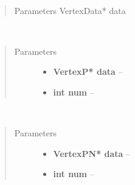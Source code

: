 \documentclass[letterpaper,10pt,english]{sphinxmanual}
\begin{document}

\begin{fulllineitems}
\label{gl:VBO::setVertexData__VertexDataP}~\begin{quote}\begin{description}
\item[{Parameters VertexData* data}] \leavevmode


\end{description}\end{quote}

\end{fulllineitems}


\begin{fulllineitems}
\label{gl:VBO::setVertexData__VertexPP.i}~\begin{quote}\begin{description}
\item[{Parameters}] \leavevmode\begin{itemize}
\item {} 
\textbf{VertexP* data} -- 

\item {} 
\textbf{int num} -- 

\end{itemize}

\end{description}\end{quote}

\end{fulllineitems}


\begin{fulllineitems}
\label{gl:VBO::setVertexData__VertexPNP.i}~\begin{quote}\begin{description}
\item[{Parameters}] \leavevmode\begin{itemize}
\item {} 
\textbf{VertexPN* data} -- 

\item {} 
\textbf{int num} -- 

\end{itemize}

\end{description}\end{quote}

\end{fulllineitems}
\end{document}
